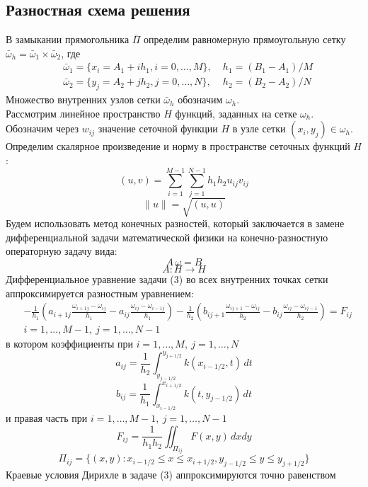 \documentclass[oneside,final,14pt]{extreport}
\begin{document}
\subsection{Разностная схема решения}
\noindent
В замыкании прямогольника \( \bar \Pi \) определим равномерную
прямоугольную сетку \( \bar \omega_h = \bar \omega_1 \times \bar \omega_2 \),
где
\[ \begin{aligned}
& \bar \omega_1 = \{x_i = A_1 + ih_1, i = 0, \ldots, M\}, \;
& h_1 = (B_1 - A_1) / M \\
& \bar \omega_2 = \{y_j = A_2 + jh_2, j = 0, \ldots, N\}, \;
& h_2 = (B_2 - A_2) / N 
\end{aligned} \]
Множество внутренних узлов сетки \( \bar \omega_h \) обозначим \( \omega_h \).\\
Рассмотрим линейное пространство \( H \) функций, заданных на сетке
\( \omega_h \).\\
Обозначим через \( w_{ij} \) значение сеточной функции \( H \) в узле сетки
\( (x_i, y_j) \in \omega_h \).
Определим скалярное произведение и норму в пространстве сеточных функций
\( H \):
\[ (u, v) = \sum_{i = 1}^{M-1} \sum_{j = 1}^{N-1} h_1 h_2 u_{ij} v_{ij} \]
\[ \| u \| = \sqrt{(u, u)} \]
Будем использовать метод конечных разностей, который заключается в замене
дифференциальной задачи математической физики на 
конечно-разностную операторную задачу вида:
\[ A \, \omega = B \]
\[ A: H \rightarrow  H \]
Дифференциальное уравнение задачи (3) во всех внутренних точках
сетки аппроксимируется разностным уравнением:
\[ \begin{aligned}
  & -\frac{1}{h_1}(a_{i+1 j} \frac{\omega_{i+1 j} - \omega_{ij}}{h_1}
- a_{ij} \frac{\omega_{ij} - \omega_{i-1 j}}{h_1})
    -\frac{1}{h_2}(b_{i j+1} \frac{\omega_{i j+1} - \omega_{ij}}{h_2}
- b_{ij} \frac{\omega_{ij} - \omega_{i j-1}}{h_2}) = F_{ij} \\
  & i = 1, \ldots, M-1, \: j = 1, \ldots, N-1
\end{aligned} \]
в котором коэффициенты при \( i = 1, \ldots, M, \: j = 1, \ldots, N \)\\
\[ a_{ij} = \frac{1}{h_2} \int_{y_{j-1/2}}^{y_{j+1/2}} k(x_{i-1/2}, t) \,dt \]
\[ b_{ij} = \frac{1}{h_1} \int_{x_{i-1/2}}^{x_{i+1/2}} k(t, y_{j-1/2}) \,dt \]
и правая часть при \( i = 1, \ldots, M-1, \: j = 1, \ldots, N-1\)\\
\[ F_{ij} = \frac{1}{h_1 h_2} \iint_{\Pi_{ij}} F(x, y) \, dx dy \]
\[ \Pi_{ij} =
\{ (x, y): x_{i-1/2} \le x \le x_{i+1/2}, y_{j-1/2} \le y \le y_{j+1/2}\} \]
Краевые условия Дирихле в задаче (3) аппроксимируются точно равенством
\end{document}
